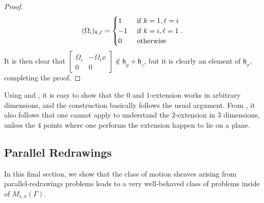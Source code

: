 \documentclass{article}
\theoremstyle{definition}
\theoremstyle{remark}
\begin{document}
\begin{proof}
\begin{equation*}
    (\Omega_i)_{k, \ell} =\begin{cases} 1
        & \textup{ if } k=1, \ell = i\\
        - 1
        & \textup{ if } k= i, \ell = 1\\
        0
        & \textup{ otherwise }
    \end{cases}.
    \end{equation*}
    It is then clear that $\begin{bmatrix}
        \Omega_i & - \Omega_i x\\
        0 & 0
    \end{bmatrix}\notin \mathfrak{h}_y +\mathfrak{h}_z$, but it is clearly an element of $\mathfrak{h}_x$, completing the proof.
\end{proof}

Using  and , it is easy to show that the $0$ and $1$-extension works in arbitrary dimensions, and the construction basically follows the usual argument. From , it also follows that one cannot apply   to understand the $2$-extension in $3$ dimensions, unless the $4$ points where one performs the extension happen to lie on a plane.

\subsection{Parallel Redrawings}

In this final section, we show that the class of motion sheaves arising from parallel-redrawings problems leads to a very well-behaved class of problems inside of $M_{s,n}(\Gamma)$.
\end{document}

